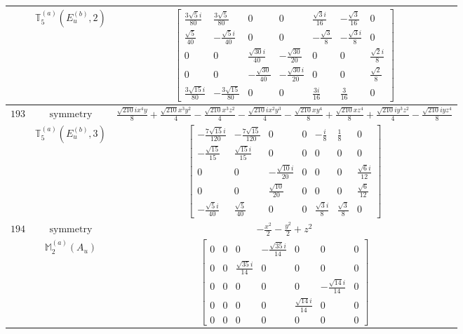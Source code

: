 \documentclass[fleqn,8pt,landscape]{jsarticle}
\begin{document}
\begin{longtable}{ccc}
$  $ & $ \mathbb{T}_{5}^{(a)}(E_{u}^{(b)},2) $ & $ \begin{bmatrix} \frac{3 \sqrt{5} i}{80} & \frac{3 \sqrt{5}}{80} & 0 & 0 & \frac{\sqrt{3} i}{16} & - \frac{\sqrt{3}}{16} & 0 \\ \frac{\sqrt{5}}{40} & - \frac{\sqrt{5} i}{40} & 0 & 0 & - \frac{\sqrt{3}}{8} & - \frac{\sqrt{3} i}{8} & 0 \\ 0 & 0 & \frac{\sqrt{30} i}{40} & - \frac{\sqrt{30}}{20} & 0 & 0 & \frac{\sqrt{2} i}{8} \\ 0 & 0 & - \frac{\sqrt{30}}{40} & - \frac{\sqrt{30} i}{20} & 0 & 0 & \frac{\sqrt{2}}{8} \\ \frac{3 \sqrt{15} i}{80} & - \frac{3 \sqrt{15}}{80} & 0 & 0 & \frac{3 i}{16} & \frac{3}{16} & 0 \end{bmatrix} $ \\ \hline
$ 193 $ & $ \text{symmetry} $ & $ \frac{\sqrt{210} i x^{4} y}{8} + \frac{\sqrt{210} x^{3} y^{2}}{4} - \frac{\sqrt{210} x^{3} z^{2}}{4} - \frac{\sqrt{210} i x^{2} y^{3}}{4} - \frac{\sqrt{210} x y^{4}}{8} + \frac{\sqrt{210} x z^{4}}{8} + \frac{\sqrt{210} i y^{3} z^{2}}{4} - \frac{\sqrt{210} i y z^{4}}{8} $ \\
$  $ & $ \mathbb{T}_{5}^{(a)}(E_{u}^{(b)},3) $ & $ \begin{bmatrix} - \frac{7 \sqrt{15} i}{120} & - \frac{7 \sqrt{15}}{120} & 0 & 0 & - \frac{i}{8} & \frac{1}{8} & 0 \\ - \frac{\sqrt{15}}{15} & \frac{\sqrt{15} i}{15} & 0 & 0 & 0 & 0 & 0 \\ 0 & 0 & - \frac{\sqrt{10} i}{20} & 0 & 0 & 0 & \frac{\sqrt{6} i}{12} \\ 0 & 0 & \frac{\sqrt{10}}{20} & 0 & 0 & 0 & \frac{\sqrt{6}}{12} \\ - \frac{\sqrt{5} i}{40} & \frac{\sqrt{5}}{40} & 0 & 0 & \frac{\sqrt{3} i}{8} & \frac{\sqrt{3}}{8} & 0 \end{bmatrix} $ \\ \hline
$ 194 $ & $ \text{symmetry} $ & $ - \frac{x^{2}}{2} - \frac{y^{2}}{2} + z^{2} $ \\
$  $ & $ \mathbb{M}_{2}^{(a)}(A_{u}) $ & $ \begin{bmatrix} 0 & 0 & 0 & - \frac{\sqrt{35} i}{14} & 0 & 0 & 0 \\ 0 & 0 & \frac{\sqrt{35} i}{14} & 0 & 0 & 0 & 0 \\ 0 & 0 & 0 & 0 & 0 & - \frac{\sqrt{14} i}{14} & 0 \\ 0 & 0 & 0 & 0 & \frac{\sqrt{14} i}{14} & 0 & 0 \\ 0 & 0 & 0 & 0 & 0 & 0 & 0 \end{bmatrix} $ \\ \hline

\end{longtable}
\end{document}
